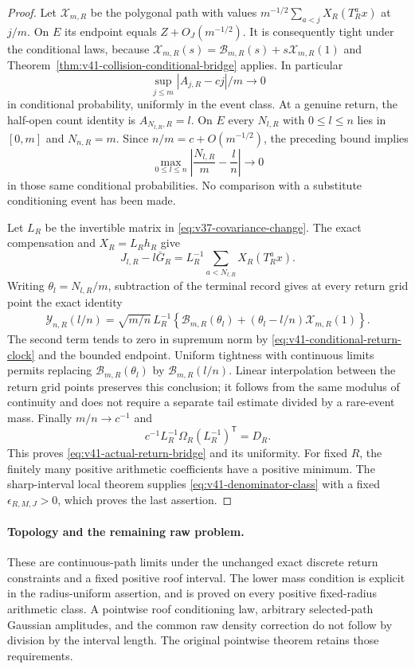 \begin{proof}
Let $\mathcal X_{m,R}$ be the polygonal path with values
$m^{-1/2}\sum_{a<j}X_R(T_R^ax)$ at $j/m$. On $E$ its endpoint equals
$Z+O_J(m^{-1/2})$. It is consequently tight under the conditional laws,
because $\mathcal X_{m,R}(s)=\mathcal B_{m,R}(s)
+s\mathcal X_{m,R}(1)$ and Theorem~\ref{thm:v41-collision-conditional-bridge}
applies. In particular
\[
 \sup_{j\le m}|A_{j,R}-cj|/m\longrightarrow0
\]
in conditional probability, uniformly in the event class. At a genuine
return, the half-open count identity is $A_{N_{l,R},R}=l$.
On $E$ every $N_{l,R}$ with $0\le l\le n$ lies in $[0,m]$ and
$N_{n,R}=m$. Since $n/m=c+O(m^{-1/2})$, the preceding bound implies
\begin{equation}\label{eq:v41-conditional-return-clock}
 \max_{0\le l\le n}\left|\frac{N_{l,R}}m-\frac ln\right|
                              \longrightarrow0
\end{equation}
in those same conditional probabilities. No comparison with a
substitute conditioning event has been made.

Let $L_R$ be the invertible matrix in
\eqref{eq:v37-covariance-change}. The exact compensation and
$X_R=L_Rh_R$ give
\[
 J_{l,R}-l\bar G_R
     =L_R^{-1}\sum_{a<N_{l,R}}X_R(T_R^ax).
\]
Writing $\theta_l=N_{l,R}/m$, subtraction of the terminal record gives
at every return grid point the exact identity
\begin{align}\label{eq:v41-pinned-time-change}
 \mathcal Y_{n,R}(l/n)
   =\sqrt{m/n}\,L_R^{-1}
       \left\{\mathcal B_{m,R}(\theta_l)
              +(\theta_l-l/n)\mathcal X_{m,R}(1)\right\}.
\end{align}
The second term tends to zero in supremum norm by
\eqref{eq:v41-conditional-return-clock} and the bounded endpoint.
Uniform tightness with continuous limits permits replacing
$\mathcal B_{m,R}(\theta_l)$ by $\mathcal B_{m,R}(l/n)$.
Linear interpolation between the return grid points preserves this
conclusion; it follows from the same modulus of continuity and does
not require a separate tail estimate divided by a rare-event mass.
Finally $m/n\to c^{-1}$ and
\[
 c^{-1}L_R^{-1}\Omega_R(L_R^{-1})^{\mathsf T}=D_R.
\]
This proves \eqref{eq:v41-actual-return-bridge} and its uniformity.
For fixed $R$, the finitely many positive arithmetic coefficients
have a positive minimum. The sharp-interval local theorem supplies
\eqref{eq:v41-denominator-class} with a fixed $\epsilon_{R,M,J}>0$,
which proves the last assertion.
\end{proof}

\paragraph{Topology and the remaining raw problem.}
These are continuous-path limits under the unchanged exact discrete
return constraints and a fixed positive roof interval. The lower mass
condition is explicit in the radius-uniform assertion, and is proved
on every positive fixed-radius arithmetic class. A pointwise roof
conditioning law, arbitrary selected-path Gaussian amplitudes, and the
common raw density correction do not follow by division by the interval
length. The original pointwise theorem retains those requirements.
